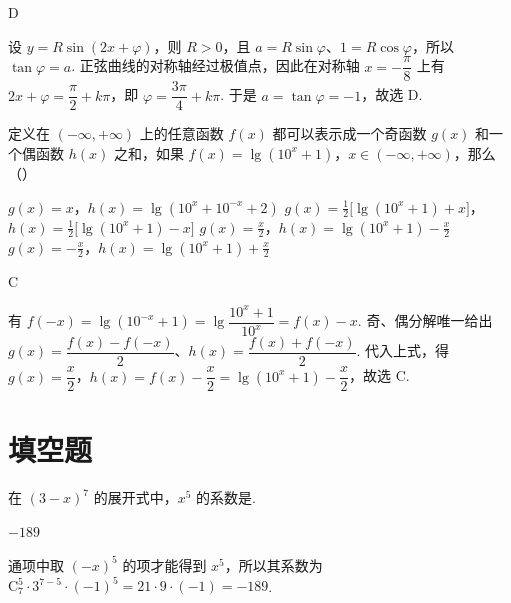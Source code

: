 \documentclass[UTF8,a4paper,oneside,11pt]{ctexbook}
\begin{document}
\begin{answer}
D
\end{answer}

\begin{solution}
设 \(y=R\sin(2x+\varphi)\)，则 \(R>0\)，且 \(a=R\sin\varphi\)、\(1=R\cos\varphi\)，所以 \(\tan\varphi=a\). 正弦曲线的对称轴经过极值点，因此在对称轴 \(x=-\dfrac\pi8\) 上有 \(2x+\varphi=\dfrac\pi2+k\pi\)，即 \(\varphi=\dfrac{3\pi}{4}+k\pi\). 于是 \(a=\tan\varphi=-1\)，故选 D.
\end{solution}

\begin{problem}
定义在 \((- \infty, + \infty)\) 上的任意函数 \(f(x)\) 都可以表示成一个奇函数 \(g(x)\) 和一个偶函数 \(h(x)\) 之和，如果 \(f(x) = \lg (10^{x} + 1)\)，\(x \in (-\infty, +\infty)\)，那么（\quad）

\choices
    {\(g(x) = x\)，\(h(x) = \lg (10^{x} + 10^{-x} + 2)\)}
    {\(g(x) = \frac{1}{2}\bigl[\lg (10^{x} + 1) + x\bigr]\)，\(h(x) = \frac{1}{2}\bigl[\lg (10^{x} + 1) - x\bigr]\)}
    {\(g(x) = \frac{x}{2}\)，\(h(x) = \lg (10^x + 1) - \frac{x}{2}\)}
    {\(g(x) = -\frac{x}{2}\)，\(h(x) = \lg (10^x + 1) + \frac{x}{2}\)}
\end{problem}

\begin{answer}
C
\end{answer}

\begin{solution}
有 \(f(-x)=\lg(10^{-x}+1)=\lg\dfrac{10^x+1}{10^x}=f(x)-x\). 奇、偶分解唯一给出 \(g(x)=\dfrac{f(x)-f(-x)}2\)、\(h(x)=\dfrac{f(x)+f(-x)}2\). 代入上式，得 \(g(x)=\dfrac x2\)，\(h(x)=f(x)-\dfrac x2=\lg(10^x+1)-\dfrac x2\)，故选 C.
\end{solution}

\section{填空题}

\begin{problem}
在 \((3 - x)^7\) 的展开式中，\(x^5\) 的系数是\fillinblank{}.
\end{problem}

\begin{answer}
\(-189\)
\end{answer}

\begin{solution}
通项中取 \((-x)^5\) 的项才能得到 \(x^5\)，所以其系数为 \(\mathrm C_7^5\cdot3^{7-5}\cdot(-1)^5=21\cdot9\cdot(-1)=-189\).
\end{solution}
\end{document}
